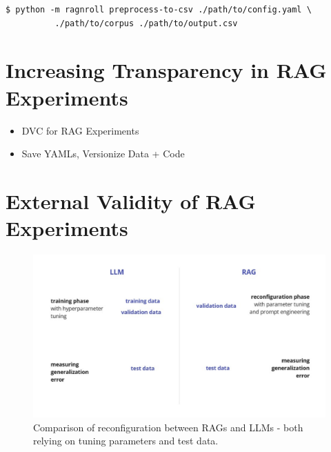 \begin{verbatim}
$ python -m ragnroll preprocess-to-csv ./path/to/config.yaml \
          ./path/to/corpus ./path/to/output.csv
\end{verbatim}


\section{Increasing Transparency in RAG Experiments}

\begin{itemize}
    \item DVC for RAG Experiments
    \item Save YAMLs, Versionize Data + Code
\end{itemize}

\section{External Validity of RAG Experiments}

\begin{figure}
    \centering
    \includegraphics[width=\textwidth]{images/RAGvsLLM-tuning.pdf}
    \caption{Comparison of reconfiguration between RAGs and LLMs - both relying on tuning parameters and test data.}
    \label{fig:tuning}
\end{figure}


